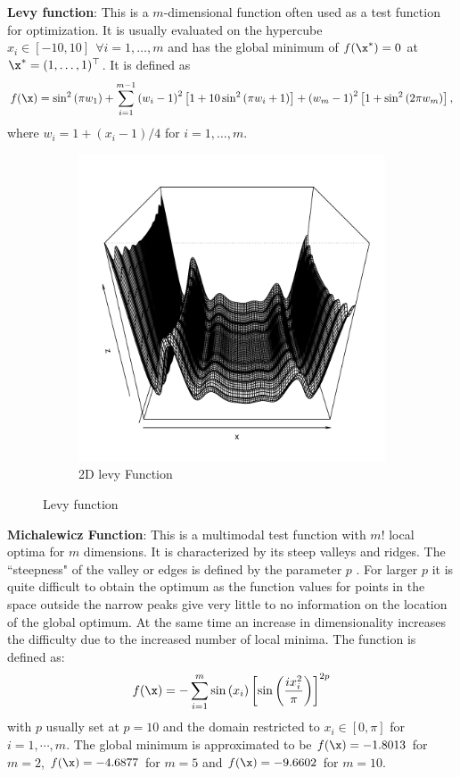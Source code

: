 \documentclass [PhD] {package/uclathes}
\begin{document}
\textbf{Levy function}: This is a $m$-dimensional function often used as a test function for optimization. It is usually evaluated on the hypercube $x_i\in[-10,10]~~\forall i=1,\ldots,m$ and has the global minimum of $f(\x^*)=0$ at $\x^*=(1,\ldots,1)^\top$. It is defined as
\[
f(\x)=\sin ^2\left(\pi w_1\right)+\sum_{i=1}^{m-1}\left(w_i-1\right)^2\left[1+10 \sin ^2\left(\pi w_i+1\right)\right]+\left(w_m-1\right)^2\left[1+\sin ^2\left(2 \pi w_m\right)\right],
\]
where $w_i=1+(x_i-1)/{4}$ for  $i=1, \ldots, m$.

\begin{figure}%
\centering
\begin{subfigure}[b]{0.4\textwidth}
\centering
\includegraphics[width=\textwidth]{chapters/EGO/pdfs/levy_10}
\caption{2D levy Function}
\end{subfigure}
\caption{Levy function}
\end{figure}

\textbf{Michalewicz Function}: This is a multimodal test function with $m!$ local optima for $m$ dimensions. It is characterized by its steep valleys and ridges. The ``steepness" of the valley or edges is defined by the parameter $p$ \parencite{molga2005test}. For larger $p$ it is quite difficult to obtain the optimum as the function values for points in the space outside the narrow peaks give very little to no information on the location of the global optimum. At the same time an increase in dimensionality increases the difficulty due to the increased number of local minima. The function is defined as:
\begin{equation*}
f(\x)=-\sum_{i=1}^m \sin \left(x_i\right)\left[\sin \left(\frac{i x_i^2}{\pi}\right)\right]^{2 p}
\end{equation*}
with $p$ usually set at $p = 10$ and the domain restricted to $x_i \in [0, \pi]$ for $i = 1,\cdots,m$. The global minimum is approximated to be $f(\x) = -1.8013$ for $m = 2$, $f(\x) = -4.6877$ for $m = 5$ and $f(\x) = -9.6602$ for $m = 10$.
\end{document}
